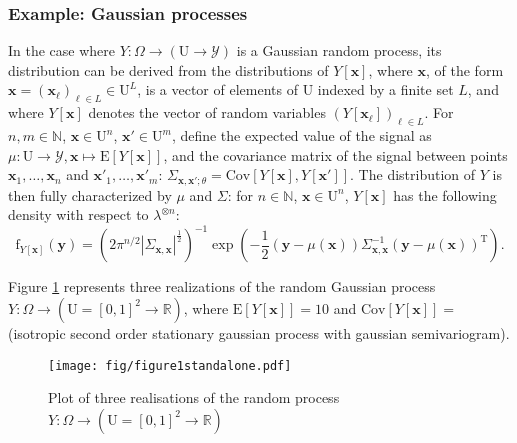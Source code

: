 \documentclass[12pt]{article}
\theoremstyle{definition}
\theoremstyle{remark}
\newcommand{\dominantY}{\lambda}
\newcommand{\parampop}{\theta}
\newcommand{\provar}{\Sigma}
\newcommand{\Cov}{\mathrm{Cov}}
\newcommand{\density}{\mathrm{f}}
\newcommand{\Pop}{\mathrm{U}}
\newcommand{\position}{\mathbf{x}}
\newcommand{\Sampleindex}{L}
\newcommand{\SignalSpace}{\mathscr{Y}}
\newcommand{\Signal}{Y}
\newcommand{\signal}{\mathbf{y}}
\begin{document}
\subsubsection*{Example: Gaussian processes}
In the case where $\Signal:\Omega\to(\Pop\to\SignalSpace)$ is a   Gaussian random process, its distribution  can be derived from the distributions of $\Signal[\position]$, where $\position$, of the form $\position=(\position_\ell)_{\ell\in \Sampleindex}\in\Pop^\Sampleindex$, is a vector of elements of $\Pop$ indexed by a finite set $\Sampleindex$, and where $Y[\position]$ denotes the vector of random variables $(Y[\position_\ell])_{\ell\in \Sampleindex}$. 
For $n,m\in\mathbb{N}$, $\position\in\Pop^n$, $\position'\in\Pop^m$, define the expected value of the signal as $\mu:\Pop\to\SignalSpace,\position\mapsto\mathrm{E}\left[\Signal[\position]\right]$, and the covariance matrix of the signal between points $\position_1,\ldots,\position_n$ and $\position'_1,\ldots,\position'_m$: $\provar_{\position,\position';\parampop}=\Cov \left[\Signal[\position],\Signal[\position']\right]$.
The distribution of $\Signal$ is then fully characterized by $\mu$ and $\provar$: for $n\in\mathbb{N}$,   $\position\in\Pop^n$, $\Signal[\position]$ has the following density with respect to $\dominantY^{\otimes n}$: 
\begin{equation} \label{eq:pdf_norm_process}
    \density_{\Signal[\position]}\left(\signal\right)=\left(2\pi^{n/2}|\provar_{\position,\position}|^{\frac12}\right)^{-1}\exp\left(-\frac12(\signal-\mu(\position))\provar_{\position,\position}^{-1}(\signal-\mu(\position))^{\!\mathrm{T}}\right).
\end{equation}
%

Figure \ref{fig:oaijsfdoij} represents three realizations of the random Gaussian process $\Signal:\Omega\to(\Pop=[0,1]^2\to\mathbb{R})$, where %
$\mathrm{E}[\Signal[\position]]=10$ and 
$\mathrm{Cov}[\Signal[\position]]=$
(isotropic second order stationary gaussian process with 
gaussian semivariogram).
\begin{figure}[H]
\hspace{-.8cm}
    \texttt{[image: fig/figure1standalone.pdf]}
    \vspace{-1cm}
    \caption{Plot of three realisations of the random process $\Signal:\Omega\to(\Pop=[0,1]^2\to\mathbb{R})$}
    \label{fig:oaijsfdoij}
\end{figure}
\end{document}
